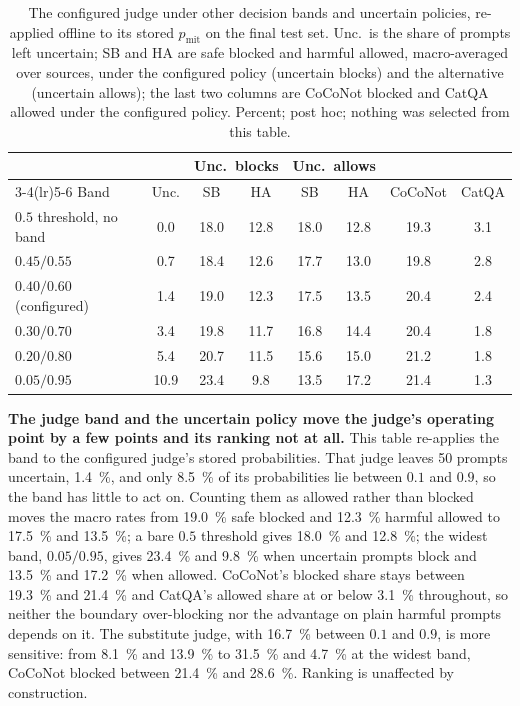 \documentclass[journal]{IEEEtran}
\begin{document}
\begin{table}[h]
\caption{The configured judge under other decision bands and uncertain
policies, re-applied offline to its stored $p_{\mathrm{mit}}$ on the final test
set. Unc.\ is the share of prompts left uncertain; SB and HA are safe blocked
and harmful allowed, macro-averaged over sources, under the configured policy
(uncertain blocks) and the alternative (uncertain allows); the last two columns
are CoCoNot blocked and CatQA allowed under the configured policy. Percent;
post hoc; nothing was selected from this table.}
\label{tab:judgeband}
\centering
\scriptsize
\setlength{\tabcolsep}{3pt}
\begin{tabular}{@{}lccccccc@{}}
\toprule
& & \multicolumn{2}{c}{Unc.\ blocks} & \multicolumn{2}{c}{Unc.\ allows} & & \\
\cmidrule(lr){3-4}\cmidrule(lr){5-6}
Band & Unc. & SB & HA & SB & HA & CoCoNot & CatQA \\
\midrule
$0.5$ threshold, no band & 0.0 & 18.0 & 12.8 & 18.0 & 12.8 & 19.3 & 3.1 \\
$0.45/0.55$ & 0.7 & 18.4 & 12.6 & 17.7 & 13.0 & 19.8 & 2.8 \\
$0.40/0.60$ (configured) & 1.4 & 19.0 & 12.3 & 17.5 & 13.5 & 20.4 & 2.4 \\
$0.30/0.70$ & 3.4 & 19.8 & 11.7 & 16.8 & 14.4 & 20.4 & 1.8 \\
$0.20/0.80$ & 5.4 & 20.7 & 11.5 & 15.6 & 15.0 & 21.2 & 1.8 \\
$0.05/0.95$ & 10.9 & 23.4 & 9.8 & 13.5 & 17.2 & 21.4 & 1.3 \\
\bottomrule
\end{tabular}
\end{table}

\textbf{The judge band and the uncertain policy move the judge's operating
point by a few points and its ranking not at all.} This table re-applies the band
to the configured judge's stored probabilities. That judge leaves 50 prompts
uncertain, \SI{1.4}{\percent}, and only \SI{8.5}{\percent} of its probabilities
lie between $0.1$ and $0.9$, so the band has little to act on. Counting them as
allowed rather than blocked moves the macro rates from \SI{19.0}{\percent} safe
blocked and \SI{12.3}{\percent} harmful allowed to \SI{17.5}{\percent} and
\SI{13.5}{\percent}; a bare $0.5$ threshold gives \SI{18.0}{\percent} and
\SI{12.8}{\percent}; the widest band, $0.05/0.95$, gives \SI{23.4}{\percent}
and \SI{9.8}{\percent} when uncertain prompts block and \SI{13.5}{\percent}
and \SI{17.2}{\percent} when allowed. CoCoNot's blocked share stays between
\SI{19.3}{\percent} and \SI{21.4}{\percent} and CatQA's allowed share at or
below \SI{3.1}{\percent} throughout, so neither the boundary over-blocking nor
the advantage on plain harmful prompts depends on it. The substitute judge, with
\SI{16.7}{\percent} between $0.1$ and $0.9$, is more sensitive: from
\SI{8.1}{\percent} and \SI{13.9}{\percent} to \SI{31.5}{\percent} and
\SI{4.7}{\percent} at the widest band, CoCoNot blocked between
\SI{21.4}{\percent} and \SI{28.6}{\percent}. Ranking is unaffected by
construction.
\end{document}
